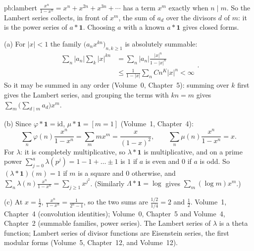 \begin{solution}{pb:lambert}
\idea $\frac{x^n}{1-x^n}=x^n+x^{2n}+x^{3n}+\cdots$ has a term $x^m$ exactly when $n\mid m$. So the Lambert series collects, in
front of $x^m$, the sum of $a_d$ over the divisors $d$ of $m$: it is the power series of $a*\mathbf1$. Choosing $a$ with a
known $a*\mathbf1$ gives closed forms.

\writeup (a) For $|x|<1$ the family $\bigl(a_nx^{kn}\bigr)_{n,k\ge1}$ is absolutely summable:
\[
\begin{aligned}
\sum_n|a_n|\sum_k|x|^{kn}
&=\sum_n|a_n|\frac{|x|^n}{1-|x|^n}\\
&\le\frac1{1-|x|}\sum_nCn^K|x|^n<\infty
\end{aligned}.
\]
So it may be summed in any
order (Volume~0, Chapter~5): summing over $k$ first gives the Lambert series, and grouping the terms with $kn=m$ gives
$\sum_m\bigl(\sum_{d\mid m}a_d\bigr)x^m$.

(b) Since $\varphi*\mathbf1=\mathrm{id}$, $\mu*\mathbf1=[m=1]$ (Volume~1, Chapter~4):
\[
\sum_n\varphi(n)\frac{x^n}{1-x^n}=\sum_mmx^m=\frac x{(1-x)^2},\qquad\sum_n\mu(n)\frac{x^n}{1-x^n}=x.
\]
For $\lambda$: it is completely multiplicative, so $\lambda*\mathbf1$ is multiplicative, and on a prime power
$\sum_{j=0}^a\lambda(p^j)=1-1+\dots\pm1$ is $1$ if $a$ is even and $0$ if $a$ is odd. So $(\lambda*\mathbf1)(m)=1$ if $m$ is a
square and $0$ otherwise, and $\sum_n\lambda(n)\frac{x^n}{1-x^n}=\sum_{j\ge1}x^{j^2}$. (Similarly $\Lambda*\mathbf1=\log$ gives
$\sum_m(\log m)x^m$.)

(c) At $x=\frac12$, $\frac{x^n}{1-x^n}=\frac1{2^n-1}$, so the two sums are $\frac{1/2}{1/4}=2$ and $\frac12$.
\tools Volume~1, Chapter~4 (convolution identities); Volume~0, Chapter~5 and Volume~4, Chapter~2 (summable families, power series).
\leads The Lambert series of $\lambda$ is a theta function; Lambert series of divisor functions are Eisenstein series, the
first modular forms (Volume~5, Chapter~12, and Volume~12).
\end{solution}

